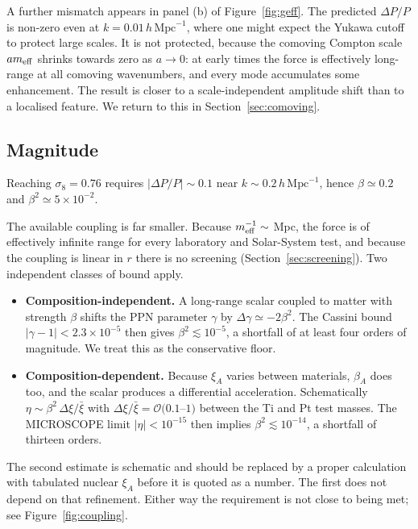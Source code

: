 \documentclass[11pt,a4paper]{article}
\newcommand{\hMpc}{h\,\mathrm{Mpc}^{-1}}
\newcommand{\meff}{m_{\rm eff}}
\begin{document}
A further mismatch appears in panel (b) of Figure~\ref{fig:geff}. The predicted
$\Delta P/P$ is non-zero even at $k=0.01\,\hMpc$, where one might expect the Yukawa
cutoff to protect large scales. It is not protected, because the comoving Compton
scale $a\meff$ shrinks towards zero as $a\to0$: at early times the force is
effectively long-range at all comoving wavenumbers, and every mode accumulates some
enhancement. The result is closer to a scale-independent amplitude shift than to a
localised feature. We return to this in Section~\ref{sec:comoving}.

\subsection{Magnitude}

Reaching $\sigma_8=0.76$ requires $|\Delta P/P|\sim0.1$ near $k\sim0.2\,\hMpc$, hence
$\beta\simeq0.2$ and $\beta^2\simeq5\times10^{-2}$.

The available coupling is far smaller. Because $\meff^{-1}\sim$ Mpc, the force is of
effectively infinite range for every laboratory and Solar-System test, and because
the coupling is linear in $r$ there is no screening (Section~\ref{sec:screening}).
Two independent classes of bound apply.

\begin{itemize}[leftmargin=1.4em,itemsep=2pt]
\item \textbf{Composition-independent.} A long-range scalar coupled to matter with
strength $\beta$ shifts the PPN parameter $\gamma$ by $\Delta\gamma\simeq-2\beta^2$.
The Cassini bound $|\gamma-1|<2.3\times10^{-5}$ then gives
$\beta^2\lesssim10^{-5}$, a shortfall of at least four orders of magnitude. We treat
this as the conservative floor.
\item \textbf{Composition-dependent.} Because $\xi_A$ varies between materials,
$\beta_A$ does too, and the scalar produces a differential acceleration.
Schematically $\eta\sim\beta^2\,\Delta\xi/\bar\xi$ with $\Delta\xi/\bar\xi=\mathcal{O}(0.1$--$1)$
between the Ti and Pt test masses. The MICROSCOPE limit $|\eta|<10^{-15}$ then
implies $\beta^2\lesssim10^{-14}$, a shortfall of thirteen orders.
\end{itemize}

\noindent
The second estimate is schematic and should be replaced by a proper calculation with
tabulated nuclear $\xi_A$ before it is quoted as a number. The first does not depend
on that refinement. Either way the requirement is not close to being met; see
Figure~\ref{fig:coupling}.
\end{document}
